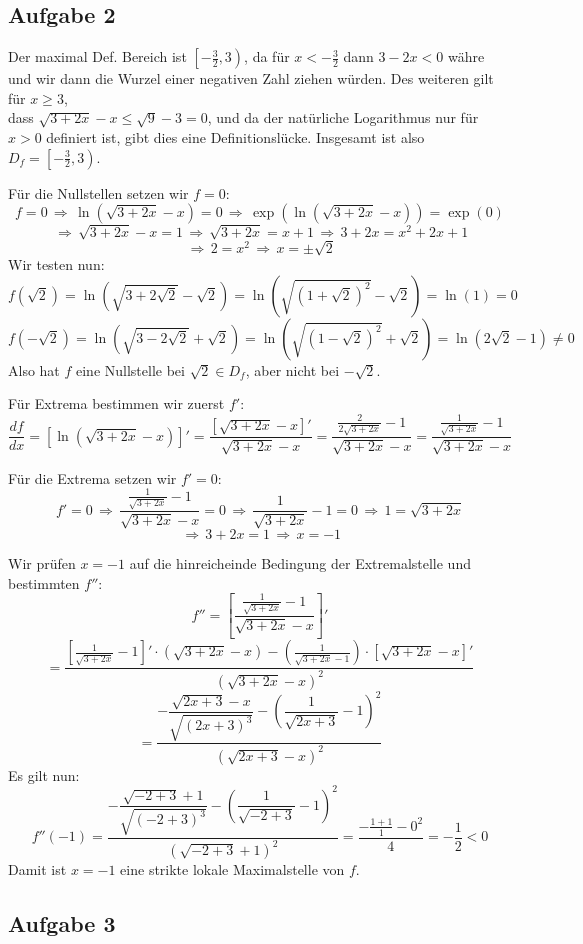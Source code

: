 \documentclass[a4paper,graphics,11pt]{article}
\newcommand{\aufgabe}[1]{\subsection*{Aufgabe #1}}
\begin{document}
\aufgabe{2}
Der maximal Def. Bereich ist $\left[-\frac{3}{2} , 3\right)$, da für $x < - \frac{3}{2}$ dann
$3 - 2x < 0$ währe und wir dann die Wurzel einer negativen Zahl ziehen würden.
Des weiteren gilt für $x \geq 3$,\\ dass $\sqrt{3+2x} - x \leq \sqrt{9} - 3= 0$, und da
der natürliche Logarithmus nur für $x > 0$ definiert ist, gibt dies eine Definitionslücke.
Insgesamt ist also $D_f = \left[-\frac{3}{2}, 3\right)$.

Für die Nullstellen setzen wir $f = 0$:
$$
    f = 0 \,\Longrightarrow\, \ln\left(\sqrt{3+2x}-x\right) = 0
    \,\Longrightarrow\, \exp\left(\ln\left(\sqrt{3+2x}-x\right)\right) = \exp(0)
$$$$
    \,\Longrightarrow\, \sqrt{3+2x} -x = 1 \,\Longrightarrow\, \sqrt{3+2x} = x+1
    \,\Longrightarrow\, 3+2x = x^2+2x+1
$$$$
    \,\Longrightarrow\, 2 = x^2 \,\Longrightarrow\, x = \pm\sqrt{2}
$$
Wir testen nun:
$$
    f(\sqrt{2}) = \ln\left(\sqrt{3+2\sqrt{2}}-\sqrt{2}\right)
    = \ln\left(\sqrt{(1+\sqrt{2})^2} -\sqrt{2}\right)
    = \ln(1) = 0
$$$$
    f(-\sqrt{2}) = \ln\left(\sqrt{3-2\sqrt{2}}+\sqrt{2}\right)
    = \ln\left(\sqrt{(1-\sqrt{2})^2} +\sqrt{2}\right)
    = \ln(2\sqrt{2}-1) \neq 0
$$
Also hat $f$ eine Nullstelle bei $\sqrt{2} \in D_f$, aber nicht bei $-\sqrt{2}$.

Für Extrema bestimmen wir zuerst $f'\colon$
$$
    \frac{df}{dx} = \left[\ln\left(\sqrt{3+2x}-x\right)\right]'
    = \frac{\left[\sqrt{3+2x}-x\right]'}{\sqrt{3+2x} -x}
    = \frac{\frac{2}{2\sqrt{3+2x}}-1}{\sqrt{3+2x} -x}
    = \frac{\frac{1}{\sqrt{3+2x}}-1}{\sqrt{3+2x}-x}
$$

Für die Extrema setzen wir $f' = 0\colon$
$$
    f'=0 \,\Longrightarrow\, \frac{\frac{1}{\sqrt{3+2x}} -1}{\sqrt{3+2x} -x} = 0
    \,\Longrightarrow\, \frac{1}{\sqrt{3+2x}} -1 = 0
    \,\Longrightarrow\, 1 = \sqrt{3+2x}
$$$$
    \,\Longrightarrow\, 3+2x = 1
    \,\Longrightarrow\, x = -1
$$

Wir prüfen $x=-1$ auf die hinreicheinde Bedingung der Extremalstelle und bestimmten $f''$:
$$
    f'' = \left[\frac{\frac{1}{\sqrt{3+2x}}-1}{\sqrt{3+2x} -x}\right]'
$$$$
    = \frac{\left[\frac{1}{\sqrt{3+2x}} -1\right]'\cdot \left(\sqrt{3+2x}-x\right)
        - \left(\frac{1}{\sqrt{3+2x}-1}\right) \cdot \left[\sqrt{3+2x}-x\right]'}
        {\left(\sqrt{3+2x} -x\right)^2}
$$$$
    = \frac{-\dfrac{\sqrt{2x+3} -x}{\sqrt{(2x+3)^3}}
        - \left(\dfrac{1}{\sqrt{2x+3}}-1\right)^2}{\left(\sqrt{2x+3}-x\right)^2}
$$
Es gilt nun:
$$
    f''(-1) = \frac{-\dfrac{\sqrt{-2+3} +1}{\sqrt{(-2+3)^3}}
        - \left(\dfrac{1}{\sqrt{-2+3}}-1\right)^2}{\left(\sqrt{-2+3}+1\right)^2}
    = \frac{-\frac{1+1}{1} - 0^2}{4} = -\frac{1}{2} < 0
$$
Damit ist $x = -1$ eine strikte lokale Maximalstelle von $f$.

\newpage

\aufgabe{3}
\end{document}
